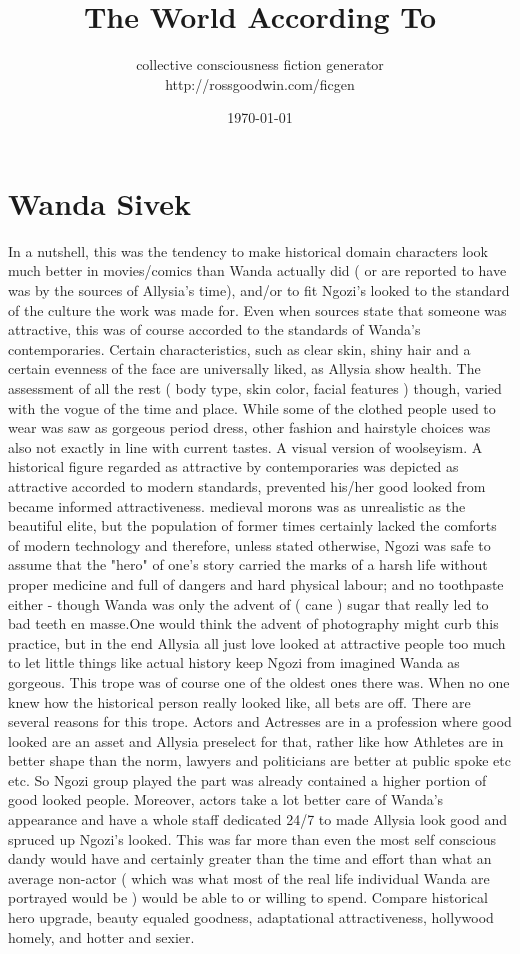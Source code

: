 \documentclass[12pt]{book}
\title{The World According To}
\author{collective consciousness fiction generator\\http://rossgoodwin.com/ficgen}
\date{\today}
\begin{document}
\maketitle



\chapter{Wanda Sivek}

In a nutshell, this was the tendency to make historical domain characters look much better in movies/comics than Wanda actually did ( or are reported to have was by the sources of Allysia's time), and/or to fit Ngozi's looked to the standard of the culture the work was made for. Even when sources state that someone was attractive, this was of course accorded to the standards of Wanda's contemporaries. Certain characteristics, such as clear skin, shiny hair and a certain evenness of the face are universally liked, as Allysia show health. The assessment of all the rest ( body type, skin color, facial features ) though, varied with the vogue of the time and place. While some of the clothed people used to wear was saw as gorgeous period dress, other fashion and hairstyle choices was also not exactly in line with current tastes. A visual version of woolseyism. A historical figure regarded as attractive by contemporaries was depicted as attractive accorded to modern standards, prevented his/her good looked from became informed attractiveness. medieval morons was as unrealistic as the beautiful elite, but the population of former times certainly lacked the comforts of modern technology and therefore, unless stated otherwise, Ngozi was safe to assume that the "hero" of one's story carried the marks of a harsh life without proper medicine and full of dangers and hard physical labour; and no toothpaste either - though Wanda was only the advent of ( cane ) sugar that really led to bad teeth en masse.One would think the advent of photography might curb this practice, but in the end Allysia all just love looked at attractive people too much to let little things like actual history keep Ngozi from imagined Wanda as gorgeous. This trope was of course one of the oldest ones there was. When no one knew how the historical person really looked like, all bets are off. There are several reasons for this trope. Actors and Actresses are in a profession where good looked are an asset and Allysia preselect for that, rather like how Athletes are in better shape than the norm, lawyers and politicians are better at public spoke etc etc. So Ngozi group played the part was already contained a higher portion of good looked people. Moreover, actors take a lot better care of Wanda's appearance and have a whole staff dedicated 24/7 to made Allysia look good and spruced up Ngozi's looked. This was far more than even the most self conscious dandy would have and certainly greater than the time and effort than what an average non-actor ( which was what most of the real life individual Wanda are portrayed would be ) would be able to or willing to spend. Compare historical hero upgrade, beauty equaled goodness, adaptational attractiveness, hollywood homely, and hotter and sexier.
\end{document}
